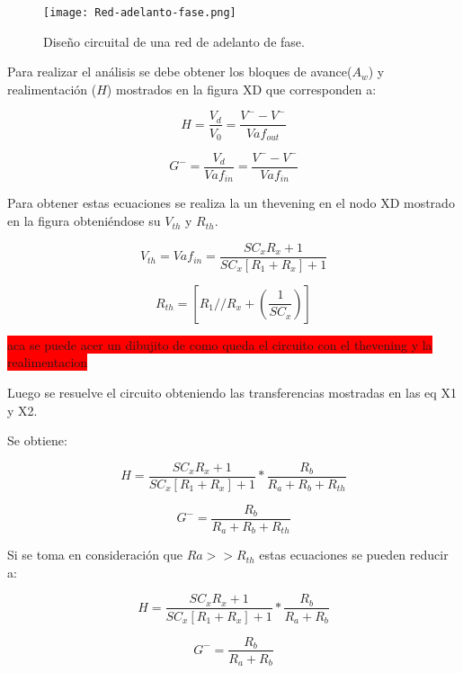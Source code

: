 \begin{figure}[H]
	\centering
	\texttt{[image: Red-adelanto-fase.png]}
	\caption{Diseño circuital de una red de adelanto de fase.}
	\label{fig:red-adelanto-fase}
\end{figure}

Para realizar el análisis se debe obtener los bloques de avance($A_w$) y realimentación ($H$) mostrados en la figura XD que corresponden a:

\begin{equation} 
	H = \frac{V_d}{V_0}=\frac{V^- - V^-}{Vaf_{out}}
\end{equation}

\begin{equation} 
	G^- = \frac{V_d}{Vaf_{in}}=\frac{V^- - V^-}{Vaf_{in}}
\end{equation}

Para obtener estas ecuaciones se realiza la un thevening en el nodo XD mostrado en la figura obteniéndose su $V_{th}$ y $R_{th}$.

\begin{equation} 
	V_{th} = Vaf_{in}= \frac{SC_xR_x+1}{SC_x[R_1+R_x]+1}
\end{equation}

\begin{equation} 
	R_{th} = [R_1 // R_x+(\frac{1}{SC_x})]
\end{equation}

\colorbox{red}{aca se puede acer un dibujito de como queda el circuito con el thevening y la realimentacion}

Luego se resuelve el circuito obteniendo las transferencias mostradas en las eq X1 y X2.

Se obtiene:

\begin{equation} 
	H = \frac{SC_xR_x+1}{SC_x[R_1+R_x]+1} * \frac{R_b}{R_a + R_b + R_{th}}
\end{equation}

\begin{equation} 
	G^- = \frac{R_b}{R_a + R_b + R_{th}}
\end{equation}

Si se toma en consideración que $Ra>>R_{th}$ estas ecuaciones se pueden reducir a: 

\begin{equation} 
	H = \frac{SC_xR_x+1}{SC_x[R_1+R_x]+1} * \frac{R_b}{R_a + R_b}
\end{equation}

\begin{equation} 
	G^- = \frac{R_b}{R_a + R_b}
\end{equation} 
  
